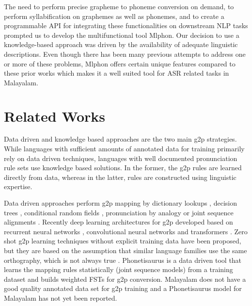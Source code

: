 \documentclass{ieeeaccess}
\begin{document}

The need to perform precise grapheme to phoneme conversion on demand, to perform syllabification on graphemes as well as phonemes, and to create a programmable API for integrating these functionalities on downstream NLP tasks prompted us to develop the multifunctional tool Mlphon. Our decision to use a knowledge-based approach was driven by the availability of adequate linguistic descriptions. Even though there has been many previous attempts to address one or more of these problems, Mlphon offers certain unique features compared to these prior works which makes it a well suited tool for ASR related tasks in Malayalam. 

\section{Related Works}
\label{literature}

Data driven and knowledge based  approaches are the two main g2p strategies. While languages with sufficient amounts of annotated data for training primarily rely on data driven techniques, languages with well documented pronunciation rule sets use knowledge based solutions. In the former, the g2p rules are learned directly from data, whereas in the latter, rules are constructed using linguistic expertise.

Data driven approaches perform g2p mapping by dictionary lookups \cite{black1998issues}, decision trees \cite{black1998issues}, conditional random fields \cite{fosler2013conditional}, pronunciation by analogy \cite{yvon1996grapheme} or joint sequence alignments \cite{bisani2008joint}. Recently deep learning architectures for g2p developed based on recurrent neural networks \cite{yao2015sequence}, convolutional neural networks \cite{yolchuyeva2019grapheme}  and transformers \cite{sevinj2019transformer}. Zero shot g2p learning techniques without explicit training data have been proposed, but they are based on the assumption that similar language families use the same orthography, which is not always true \cite{li-etal-2022-zero}. Phonetisaurus \cite{novak_minematsu_hirose_2016} is a data driven tool that learns the  mapping rules statistically (joint sequence models) from a training dataset and builds weighted FSTs for g2p conversion. Malayalam does not have a good quality annotated data set for g2p training and a Phonetisaurus model for Malayalam has not yet been reported. 
\end{document}
